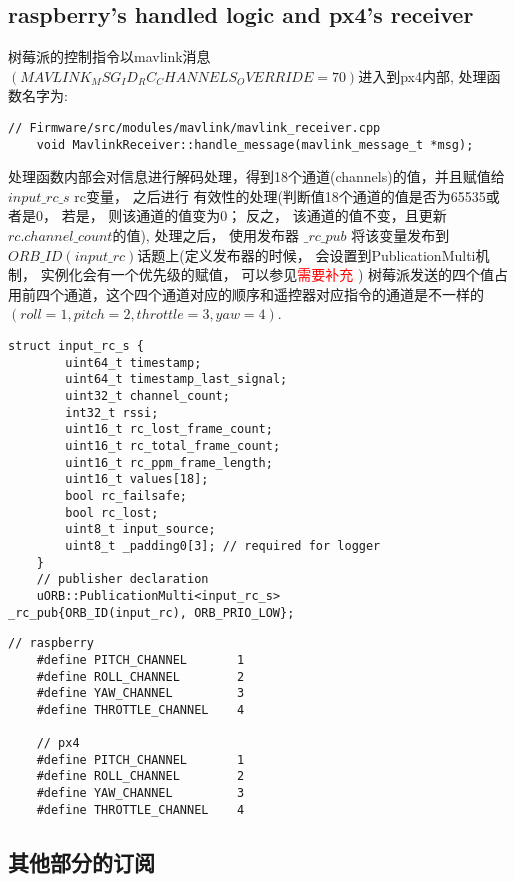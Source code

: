 \subsection{raspberry's handled logic and px4's receiver}
树莓派的控制指令以mavlink消息$(MAVLINK_MSG_ID_RC_CHANNELS_OVERRIDE = 70)$进入到px4内部, 处理函数名字为:
\begin{lstlisting}[title=mavlink处理函数声明体]
    // Firmware/src/modules/mavlink/mavlink_receiver.cpp
    void MavlinkReceiver::handle_message(mavlink_message_t *msg);
\end{lstlisting}
\par 处理函数内部会对信息进行解码处理，得到18个通道(channels)的值，并且赋值给 $input\_rc\_s$ rc{}变量， 之后进行
有效性的处理(判断值18个通道的值是否为65535或者是0， 若是， 则该通道的值变为0； 反之， 该通道的值不变，且更新$rc.channel\_count$的值),
处理之后， 使用发布器 $\_rc\_pub$ 将该变量发布到 \\ $ORB\_ID(input\_rc)$话题上(定义发布器的时候， 会设置到PublicationMulti机制， 实例化会有一个优先级的赋值， 可以参见\textcolor{red}{需要补充} )
树莓派发送的四个值占用前四个通道，这个四个通道对应的顺序和遥控器对应指令的通道是不一样的 $(roll = 1 , pitch = 2, throttle = 3, yaw = 4)$.
\begin{lstlisting}[title=$input\_rc\_s$结构体的定义]
    struct input_rc_s {
        uint64_t timestamp;
        uint64_t timestamp_last_signal;
        uint32_t channel_count;
        int32_t rssi;
        uint16_t rc_lost_frame_count;
        uint16_t rc_total_frame_count;
        uint16_t rc_ppm_frame_length;
        uint16_t values[18];
        bool rc_failsafe;
        bool rc_lost;
        uint8_t input_source;
        uint8_t _padding0[3]; // required for logger
    }
    // publisher declaration 
    uORB::PublicationMulti<input_rc_s>			_rc_pub{ORB_ID(input_rc), ORB_PRIO_LOW};
\end{lstlisting}
\begin{lstlisting}[title=树莓派以及固件通道定义]
    // raspberry
    #define PITCH_CHANNEL 		1
    #define ROLL_CHANNEL 		2
    #define YAW_CHANNEL 		3
    #define THROTTLE_CHANNEL 	4
    
    // px4
    #define PITCH_CHANNEL 		1
    #define ROLL_CHANNEL 		2
    #define YAW_CHANNEL 		3
    #define THROTTLE_CHANNEL 	4
\end{lstlisting}

\subsection{其他部分的订阅}

